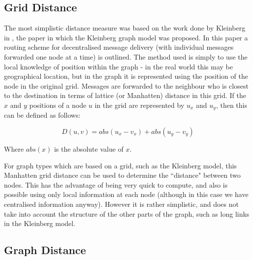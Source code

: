 \documentclass[bsc,frontabs,twoside,singlespacing,parskip,deptreport]{infthesis}     %
\begin{document}
\subsection{Grid Distance}
The most simplistic distance measure was based on the work done by Kleinberg in \cite{Kleinberg00}, the paper in which the Kleinberg graph model was proposed. In this paper a routing scheme for decentralised message delivery (with individual messages forwarded one node at a time) is outlined. The method used is simply to use the local knowledge of position within the graph - in the real world this may be geographical location, but in the graph it is represented using the position of the node in the original grid. Messages are forwarded to the neighbour who is closest to the destination in terms of lattice (or Manhatten) distance in this grid. If the $x$ and $y$ positions of a node $u$ in the grid are represented by $u_{x}$ and $u_{y}$, then this can be defined as follows:

\begin{equation}
D(u, v) = abs(u_{x} - v_{x}) + abs(u_{y} - v_{y})
\end{equation}

Where $abs(x)$ is the absolute value of $x$.

For graph types which are based on a grid, such as the Kleinberg model, this Manhatten grid distance can be used to determine the ``distance" between two nodes. This has the advantage of being very quick to compute, and also is possible using only local information at each node (although in this case we have centralised information anyway). However it is rather simplistic, and does not take into account the structure of the other parts of the graph, such as long links in the Kleinberg model.


\subsection{Graph Distance} \label{subsec:graph_dist}
\end{document}

